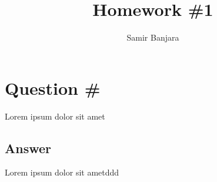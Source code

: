 \documentclass{homework}
\title{Homework \#1}
\author{Samir Banjara}
\institute{Stevens Institute of Technology}
\begin{document}
\maketitle

\section*{Question \#}

\begin{problem}
    Lorem ipsum dolor sit amet
\end{problem}

\subsection*{Answer}

Lorem ipsum dolor sit ametddd

\end{document}
